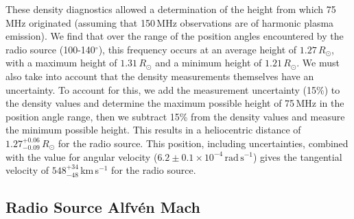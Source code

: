 These density diagnostics allowed a determination of the height from which 75\,MHz originated (assuming that 150\,MHz observations are of harmonic plasma emission). We find that over the range of the position angles encountered by the radio source (100-140$^{\circ}$), this frequency occurs at an average height of $1.27\,R_{\odot}$, with a maximum height of $1.31\,R_{\odot}$ and a minimum height of $1.21\,R_{\odot}$. We must also take into account that the density measurements themselves have an uncertainty. To account for this, we add the measurement uncertainty (15\%) to the density values and determine the maximum possible height of 75\,MHz in the position angle range, then we subtract 15\% from the density values and measure the minimum possible height. This results in a heliocentric distance of $1.27^{+0.06}_{-0.09}\,R_{\odot}$ for the radio source. This position, including uncertainties, combined with the value for angular velocity ($6.2\pm0.1\times10^{-4}\,\mathrm{rad\,s^{-1}} $) gives the tangential velocity of $548^{+34}_{-48}$\,km\,s$^{-1}$ for the radio source.


\subsection{Radio Source Alfv\'{e}n Mach}

